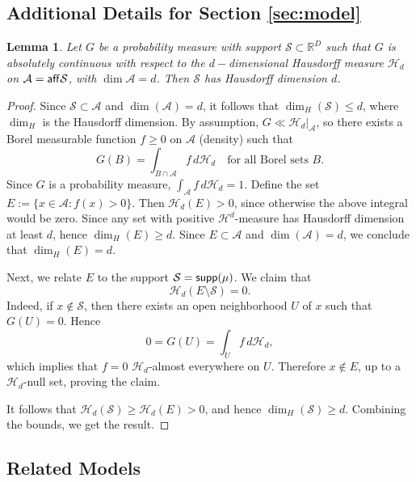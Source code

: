 \documentclass[bj,authoryear]{imsart}
\theoremstyle{plain}
\newtheorem{lemma}{Lemma}[section]
\theoremstyle{remark}
\def\aff{{\sf aff}}
\def\bbR{\mathbb{R}}
\def\cA{\mathcal{A}}
\def\cH{\mathcal{H}}
\def\cS{\mathcal{S}}
\def\supp{{\sf supp}}
\begin{document}
\newpage
\begin{appendix}

\section{Additional Details for Section \ref{sec:model}}

\begin{lemma}
    Let $G$ be a probability measure with support $\cS\subset\bbR^D$ such that $G$ is absolutely continuous with respect to the $d-$dimensional Hausdorff measure $\cH_d$ on $\cA=\aff \cS$, with $\dim \cA = d$. Then $\cS$ has Hausdorff dimension $d$.
\end{lemma}

\begin{proof}
   Since $\cS \subset \cA$ and $\dim(\cA)=d$, it follows that $\dim_H(\cS) \le d$, where $\dim_H$ is the Hausdorff dimension. By assumption, $G \ll \mathcal{H}_d |_{\cA}$, so there exists a Borel measurable function $f \ge 0$ on $\cA$ (density) such that
\[
G(B) = \int_{B \cap \cA} f \, d\mathcal{H}_d
\quad \text{for all Borel sets } B.
\]
Since $G$ is a probability measure,
$\int_{\cA} f \, d\mathcal{H}_d = 1$. Define the set $E := \{ x \in \cA : f(x) > 0 \}$. 
Then $\mathcal{H}_d(E) > 0$, since otherwise the above integral would be zero. Since any set with positive $\mathcal{H}^d$-measure has Hausdorff dimension at least $d$, hence $\dim_H(E) \ge d$.
Since $E \subset \cA$ and $\dim(\cA)=d$, we conclude that $\dim_H(E) = d$.

Next, we relate $E$ to the support $\cS = \supp(\mu)$. We claim that
\[
\mathcal{H}_d(E \setminus \cS) = 0.
\]
Indeed, if $x \notin \cS$, then there exists an open neighborhood $U$ of $x$ such that $G(U)=0$. Hence
\[
0 = G(U) = \int_U f \, d\mathcal{H}_d,
\]
which implies that $f=0$ $\mathcal{H}_d$-almost everywhere on $U$. Therefore $x \notin E$, up to a $\mathcal{H}_d$-null set, proving the claim.

It follows that $\mathcal{H}_d(\cS) \ge \mathcal{H}_d(E) > 0$, and hence
$\dim_H(\cS) \ge d$. Combining the bounds, we get the result.
\end{proof}

\subsection{Related Models}
\label{app:related models}

\end{appendix}
\end{document}
